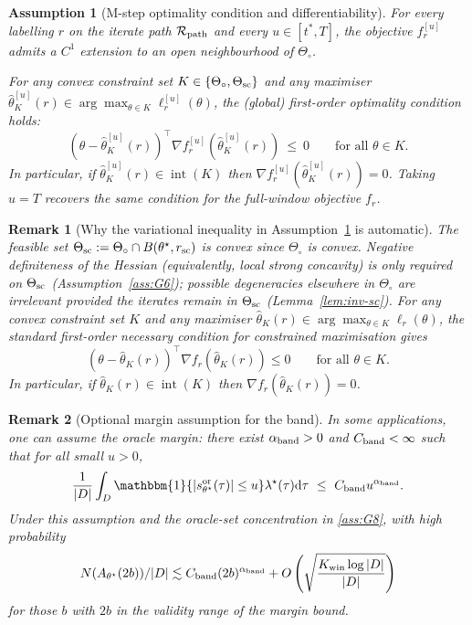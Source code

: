 \documentclass{statsoc}
\newtheorem{assumption}[assumption]{Assumption}
\newtheorem{remark}[remark]{Remark}
\newcommand{\dd}{\mathrm{d}}
\newcommand{\1}{\mathbbm{1}}
\begin{document}
\begin{assumption}[M-step optimality condition and differentiability]\label{ass:G9}
For every labelling $r$ on the iterate path $\mathcal R_{\rm path}$ and every $u\in[t^\ast,T]$,
the objective $f_r^{[u]}$ admits a $C^1$ extension to an open neighbourhood of $\Theta_\circ$.

For any convex constraint set $K\in\{\Theta_\circ,\Theta_{\rm sc}\}$ and any maximiser
$\hat\theta_K^{[u]}(r)\in\arg\max_{\theta\in K}\ell_r^{[u]}(\theta)$, the (global) first-order optimality condition holds:
\[
(\theta-\hat\theta_K^{[u]}(r))^\top \nabla f_r^{[u]}(\hat\theta_K^{[u]}(r))\ \le\ 0
\qquad\text{for all }\theta\in K.
\]
In particular, if $\hat\theta_K^{[u]}(r)\in\operatorname{int}(K)$ then
$\nabla f_r^{[u]}(\hat\theta_K^{[u]}(r))=0$.
Taking $u=T$ recovers the same condition for the full-window objective $f_r$.
\end{assumption}


\begin{remark}[Why the variational inequality in Assumption~\ref{ass:G9} is automatic]
The feasible set $\Theta_{\rm sc}:=\Theta_\circ\cap B(\theta^\star,r_{\rm sc})$ is convex since $\Theta_\circ$ is convex. Negative definiteness of the Hessian (equivalently, local strong concavity) is only required on \(\Theta_{\rm sc}\) (Assumption~\ref{ass:G6}); possible degeneracies elsewhere in \(\Theta_\circ\) are irrelevant provided the iterates remain in $\Theta_{\rm sc}$ (Lemma~\ref{lem:inv-sc}). For any convex constraint set $K$ and any maximiser $\hat\theta_K(r)\in\arg\max_{\theta\in K}\ell_r(\theta)$, the standard first-order necessary condition for constrained maximisation gives
\[
(\theta-\hat\theta_K(r))^\top \nabla f_r(\hat\theta_K(r))\le 0\qquad\text{for all }\theta\in K.
\]
In particular, if $\hat\theta_K(r)\in \operatorname{int}(K)$ then $\nabla f_r(\hat\theta_K(r))=0$.
\end{remark}

\begin{remark}[Optional margin assumption for the band]\label{rem:margin}
In some applications, one can assume the oracle margin: there exist $\alpha_{\rm band}>0$ and $C_{\rm band}<\infty$ such that for all small $u>0$,
\[
\frac{1}{|D|}\int_D \1\{|s_{\theta^\star}^{\rm or}(\tau)|\le u\} \lambda^\star(\tau) \dd\tau\ \le\ C_{\rm band} u^{\alpha_{\rm band}}.
\]
Under this assumption and the oracle-set concentration in \cref{ass:G8}, with high probability \[N(A_{\theta^\star}(2b))/|D|\lesssim C_{\rm band} (2b)^{\alpha_{\rm band}} + O\left(\sqrt{\frac{K_{\rm win}\log|D|}{|D|}}\right)\] for those $b$ with $2b$ in the validity range of the margin bound.
\end{remark}
\end{document}
